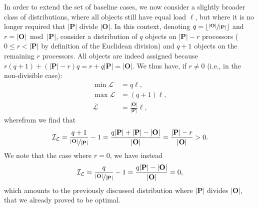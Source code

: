 In order to extend the set of baseline cases, we now consider a
slightly broader class of distributions, where all
objects still have equal load $\ell$, but where it is no longer
required that $\vert\mathbf{P}\vert$ divide $\vert\mathbf{O}\vert$.
In this context, denoting
$q=\lfloor\sfrac{\vert\mathbf{O}\vert}{\vert\mathbf{P}\vert}\rfloor$
and $r=\vert\mathbf{O}\vert\bmod\vert\mathbf{P}\vert$, consider a
distribution of $q$ objects on $\vert\mathbf{P}\vert-r$ processors
($0\le{r}<\vert\mathbf{P}\vert$ by definition of the Euclidean
division) and $q+1$ objects on the remaining $r$
processors. All objects are indeed assigned because
$r(q+1)+(\vert\mathbf{P}\vert-r)q=r+q\vert\mathbf{P}\vert=\vert\mathbf{O}\vert$.
We thus have, if $r\neq0$ (i.e., in the non-divisible case):
\begin{align*}
\min{\mathcal{L}}
&= q\ell,\\
\max{\mathcal{L}}
&= (q+1)\ell,\\
\overline{\mathcal{L}}
&= \frac{\vert\mathbf{O}\vert}{\vert\mathbf{P}\vert}\ell,
\end{align*}
wherefrom we find that
\[
\mathcal{I}_{\mathcal{L}} =
\frac{q+1}
{\sfrac{\vert\mathbf{O}\vert}{\vert\mathbf{P}\vert}} - 1
=
\frac{q\vert\mathbf{P}\vert + \vert\mathbf{P}\vert
- \vert\mathbf{O}\vert}{\vert\mathbf{O}\vert}
=
\frac{\vert\mathbf{P}\vert - r}{\vert\mathbf{O}\vert}
> 0.
\]
We note that the case where $r=0$, we have instead
\[
\mathcal{I}_{\mathcal{L}} =
\frac{q}
{\sfrac{\vert\mathbf{O}\vert}{\vert\mathbf{P}\vert}} - 1
=
\frac{q\vert\mathbf{P}\vert - \vert\mathbf{O}\vert}
{\vert\mathbf{O}\vert}
= 0,
\]
which amounts to the previously discussed distribution where
$\vert\mathbf{P}\vert$ divides $\vert\mathbf{O}\vert$, that we already
proved to be optimal.

